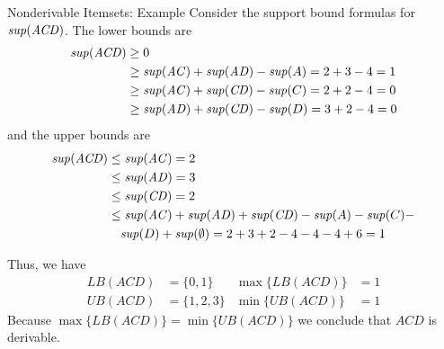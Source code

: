 \begin{frame}{Nonderivable Itemsets: Example}
  \small
Consider the support bound formulas for
$\mathit{sup}(\mathit{ACD})$. The lower bounds are
\begin{align*}
 \mathit{sup}(\mathit{ACD}) & \geq 0 \\
&\geq \mathit{sup}(\mathit{AC}) +\mathit{sup}(\mathit{AD}) - \mathit{sup}(A) = 2+3-4 = 1\\
&\geq \mathit{sup}(\mathit{AC}) + \mathit{sup}(\mathit{CD}) - \mathit{sup}(C) = 2+2-4 = 0\\
&\geq \mathit{sup}(\mathit{AD}) +\mathit{sup}(\mathit{CD}) - \mathit{sup}(D) = 3+2-4 = 0
\end{align*}
and the upper bounds are
\begin{align*}
 \mathit{sup}(\mathit{ACD}) & \leq \mathit{sup}(\mathit{AC})=2\\
            &\leq \mathit{sup}(\mathit{AD})=3\\
            &\leq \mathit{sup}(\mathit{CD})=2\\
            &\leq \mathit{sup}(\mathit{AC}) + \mathit{sup}(\mathit{AD}) + \mathit{sup}(\mathit{CD}) - \mathit{sup}(A)
            - \mathit{sup}(C) -\\
            &\quad \mathit{sup}(D)
            + \mathit{sup}(\emptyset) = 2+3+2-4-4-4+6 = 1
\end{align*}

\medskip
Thus, we have
\begin{align*}
  \mathit{LB}(\mathit{ACD}) & = \{ 0,1\} & \max \{ \mathit{LB}(\mathit{ACD}) \} & = 1\\
  \mathit{UB}(\mathit{ACD}) & = \{1,2,3\} & \min \{ \mathit{UB}(\mathit{ACD}) \} & = 1
\end{align*}
Because $\max\{\mathit{LB}(\mathit{ACD})\} = \min\{\mathit{UB}(\mathit{ACD})\}$ we conclude that $\mathit{ACD}$ is
derivable.

\end{frame}


